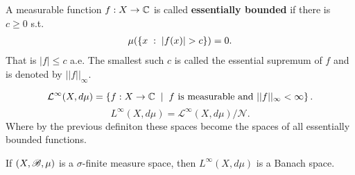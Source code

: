 \begin{definition}
    A measurable function $f:X\rightarrow \mathbb{C}$ is called \textbf{essentially bounded} if there is $c\geq 0$ s.t. 
    \begin{align}
    \mu(\left\{ x\omm:\omm |f(x)|>c \right\})=0.    
    \end{align}
    That is $|f|\leq c$ a.e. The smallest such $c$ is called the essential supremum of $f$ and is denoted by $||f||_\infty.$
\end{definition}

\begin{definition}
    $$\mathcal L^\infty(X,d\mu) = \left\{ f:X\rightarrow \mathbb{C}\hspace{2mm}|\hspace{2mm} f\text{ is measurable and }||f||_\infty <\infty \right\}.$$
    $$L^\infty (X,d\mu) =\mathcal L^\infty(X,d\mu)/\mathcal N. $$
    Where by the previous definiton these spaces become the spaces of all essentially bounded functions. 
\end{definition}
\begin{theorem}
    If $(X,\mathscr{B},\mu)$ is a $\sigma$-finite measure space, then $L^\infty(X,d\mu)$ is a Banach space.
\end{theorem}

